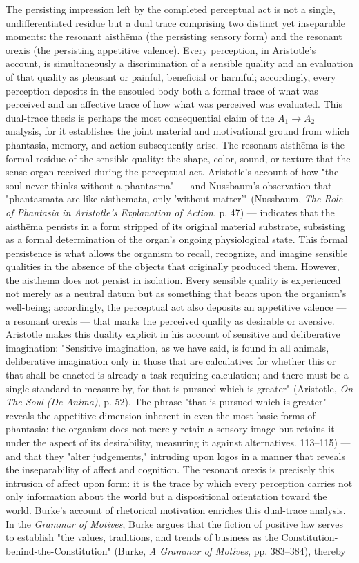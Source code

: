 The persisting impression left by the completed perceptual act is not a single, undifferentiated residue but a dual trace comprising two distinct yet inseparable moments: the resonant aisthēma (the persisting sensory form) and the resonant orexis (the persisting appetitive valence). Every perception, in Aristotle's account, is simultaneously a discrimination of a sensible quality and an evaluation of that quality as pleasant or painful, beneficial or harmful; accordingly, every perception deposits in the ensouled body both a formal trace of what was perceived and an affective trace of how what was perceived was evaluated. This dual-trace thesis is perhaps the most consequential claim of the $A_1$$\to$$A_2$ analysis, for it establishes the joint material and motivational ground from which phantasia, memory, and action subsequently arise. The resonant aisthēma is the formal residue of the sensible quality: the shape, color, sound, or texture that the sense organ received during the perceptual act. Aristotle's account of how "the soul never thinks without a phantasma" --- and Nussbaum's observation that "phantasmata are like aisthemata, only 'without matter'" (Nussbaum, \textit{The Role of Phantasia in Aristotle's Explanation of Action}, p. 47) --- indicates that the aisthēma persists in a form stripped of its original material substrate, subsisting as a formal determination of the organ's ongoing physiological state. This formal persistence is what allows the organism to recall, recognize, and imagine sensible qualities in the absence of the objects that originally produced them. However, the aisthēma does not persist in isolation. Every sensible quality is experienced not merely as a neutral datum but as something that bears upon the organism's well-being; accordingly, the perceptual act also deposits an appetitive valence --- a resonant orexis --- that marks the perceived quality as desirable or aversive. Aristotle makes this duality explicit in his account of sensitive and deliberative imagination: "Sensitive imagination, as we have said, is found in all animals, deliberative imagination only in those that are calculative: for whether this or that shall be enacted is already a task requiring calculation; and there must be a single standard to measure by, for that is pursued which is greater" (Aristotle, \textit{On The Soul (De Anima)}, p. 52). The phrase "that is pursued which is greater" reveals the appetitive dimension inherent in even the most basic forms of phantasia: the organism does not merely retain a sensory image but retains it under the aspect of its desirability, measuring it against alternatives. 113--115) --- and that they "alter judgements," intruding upon logos in a manner that reveals the inseparability of affect and cognition. The resonant orexis is precisely this intrusion of affect upon form: it is the trace by which every perception carries not only information about the world but a dispositional orientation toward the world. Burke's account of rhetorical motivation enriches this dual-trace analysis. In the \textit{Grammar of Motives}, Burke argues that the fiction of positive law serves to establish "the values, traditions, and trends of business as the Constitution-behind-the-Constitution" (Burke, \textit{A Grammar of Motives}, pp. 383--384), thereby 
